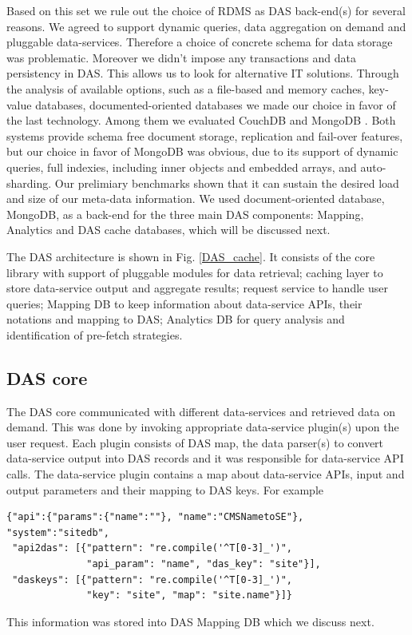 \documentclass[1p,times]{elsarticle}
\begin{document}
\noindent
Based on this set we rule out the choice of RDMS as DAS back-end(s)
for several reasons. We agreed to support dynamic queries, data
aggregation on demand and pluggable data-services. Therefore a choice 
of concrete schema for data storage was problematic. Moreover we didn't impose
any transactions and data persistency in DAS. This allows us to look 
for alternative IT solutions.
Through the analysis of available options, such as a file-based and memory caches, 
key-value databases, documented-oriented databases we made our choice in favor 
of the last technology. Among them we evaluated CouchDB \cite{CouchDB} and 
MongoDB \cite{MongoDB}. Both systems provide schema free document
storage, replication and fail-over features, but our choice in favor of 
MongoDB was obvious, due to its support of dynamic queries, 
full indexies, including inner objects and embedded arrays,
and auto-sharding. Our prelimiary benchmarks shown that it can sustain
the desired load and size of our meta-data information. We used 
document-oriented database, MongoDB, as a back-end for the three 
main DAS components: Mapping, Analytics and DAS cache databases, 
which will be discussed next. 

The DAS architecture is shown in Fig. \ref{DAS_cache}. It consists of
the core library with support of pluggable modules for data retrieval;
caching layer to store data-service output and aggregate results;
request service to handle user queries;
Mapping DB to keep information about data-service APIs, their
notations and mapping to DAS;
Analytics DB for query analysis and identification of pre-fetch 
strategies.

\subsection{DAS core}
The DAS core communicated with different data-services and retrieved
data on demand. This was done by invoking appropriate data-service plugin(s)
upon the user request. Each plugin consists of DAS map, the
data parser(s) to convert data-service output into DAS records
and it was responsible for data-service API calls.
The data-service plugin contains a map about data-service APIs,
input and output parameters and their mapping to DAS keys. For example
\begin{verbatim}
{"api":{"params":{"name":""}, "name":"CMSNametoSE"}, "system":"sitedb",
 "api2das": [{"pattern": "re.compile('^T[0-3]_')", 
              "api_param": "name", "das_key": "site"}], 
 "daskeys": [{"pattern": "re.compile('^T[0-3]_')", 
              "key": "site", "map": "site.name"}]}
\end{verbatim}
This information was stored into DAS Mapping DB which we discuss next.
\end{document}

